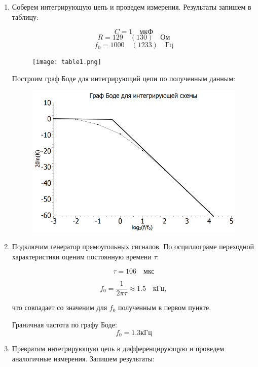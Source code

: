 \documentclass[a4paper, 12pt]{article}%
\begin{document}
\begin{enumerate}

\item Соберем интегрирующую цепь и проведем измерения. Результаты запишем в таблицу:

\[C = 1 \quad \textit{мкФ}\]
\[R = 129 \quad (130) \quad \textit{Ом}\]
\[f_0 = 1000 \quad (1233) \quad \textit{Гц} \]

\begin{figure}[h!]
\centering
\texttt{[image: table1.png]}
\label{fig:Image1}
\end{figure}

Построим граф Боде для интегрирующий цепи по полученным данным:

\begin{figure}[h!]
\centering
\includegraphics[scale=0.5]{graph1.png}
\label{fig:Image1}
\end{figure}

\item Подключим генератор прямоугольных сигналов. По осциллограме переходной характеристики оценим постоянную времени $\tau$:

\[\tau = 106 \quad \textit{мкс}\]

\[f_0 = \frac{1}{2\pi\tau} \approx 1.5 \quad \textit{кГц},\]

что совпадает со значеним для $f_0$ полученным в первом пункте.

Граничная частота по графу Боде:
\[f_0 = 1.3\text{кГц} \]

\item Превратим интегрирующую цепь в дифференцирующую и проведем аналогичные измерения. Запишем результаты:


\end{enumerate}
\end{document}

